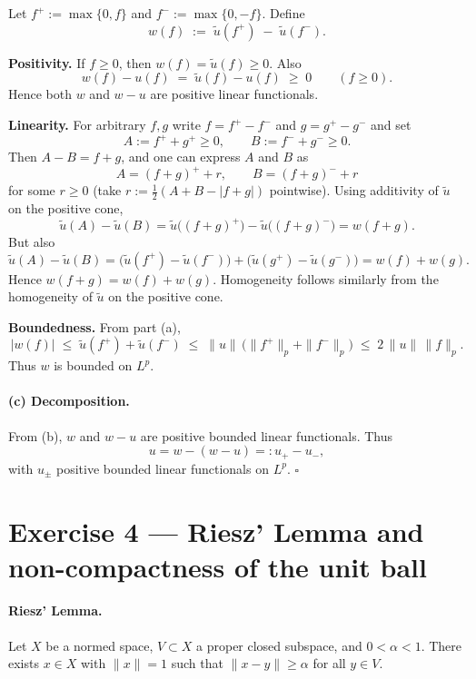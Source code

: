 \documentclass[12pt,a4paper]{article}
\newcommand{\qed}{\hfill$\square$}
\theoremstyle{plain}
\theoremstyle{definition}
\theoremstyle{remark}
\theoremstyle{remark}
\theoremstyle{definition}
\begin{document}
\noindent
Let $f^{+} := \max\{0,f\}$ and $f^{-} := \max\{0,-f\}$. Define
\[
w(f) \;:=\; \tilde u(f^{+}) \;-\; \tilde u(f^{-}).
\]

\medskip

\noindent\textbf{Positivity.}\quad
If $f \ge 0$, then $w(f) = \tilde u(f) \ge 0$.
Also
\[
w(f) - u(f) \;=\; \tilde u(f) - u(f) \;\ge\; 0
\qquad (f \ge 0).
\]
Hence both $w$ and $w-u$ are positive linear functionals.

\medskip

\noindent\textbf{Linearity.}\quad
For arbitrary $f,g$ write $f=f^{+}-f^{-}$ and $g=g^{+}-g^{-}$ and set
\[
A := f^{+}+g^{+} \ge 0, \qquad B := f^{-}+g^{-} \ge 0.
\]
Then $A-B=f+g$, and one can express $A$ and $B$ as
\[
A = (f+g)^{+} + r, \qquad B = (f+g)^{-} + r
\]
for some $r \ge 0$ (take $r := \tfrac12(A+B-|f+g|)$ pointwise).
Using additivity of $\tilde u$ on the positive cone,
\[
\tilde u(A) - \tilde u(B)
= \tilde u\big((f+g)^{+}\big) - \tilde u\big((f+g)^{-}\big)
= w(f+g).
\]
But also
\[
\tilde u(A) - \tilde u(B)
= \big(\tilde u(f^{+}) - \tilde u(f^{-})\big)
+ \big(\tilde u(g^{+}) - \tilde u(g^{-})\big)
= w(f) + w(g).
\]
Hence $w(f+g)=w(f)+w(g)$. Homogeneity follows similarly from the homogeneity of $\tilde u$
on the positive cone.

\medskip

\noindent\textbf{Boundedness.}\quad
From part (a),
\[
|w(f)|
\;\le\; \tilde u(f^{+}) + \tilde u(f^{-})
\;\le\; \|u\|\,\big(\|f^{+}\|_{p} + \|f^{-}\|_{p}\big)
\;\le\; 2\,\|u\|\,\|f\|_{p}.
\]
Thus $w$ is bounded on $L^{p}$.

	\paragraph{(c) Decomposition.}
	From (b), $w$ and $w-u$ are positive bounded linear functionals. Thus
	\[
	u=w-(w-u)=:u_{+}-u_{-},
	\]
	with $u_{\pm}$ positive bounded linear functionals on $L^{p}$.
	\qed
	
	\bigskip
	
	\section*{Exercise 4 — Riesz' Lemma and non-compactness of the unit ball}
	
	\paragraph{Riesz' Lemma.}
	Let $X$ be a normed space, $V\subset X$ a proper closed subspace, and $0<\alpha<1$.
	There exists $x\in X$ with $\|x\|=1$ such that $\|x-y\|\ge \alpha$ for all $y\in V$.
	
\end{document}
